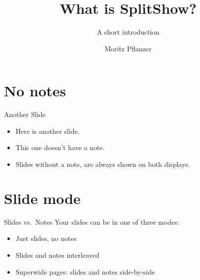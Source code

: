 \documentclass[14pt]{beamer}
\title{What is SplitShow?}
\subtitle{A short introduction}
\author{Moritz Pflanzer}
\begin{document}
\begin{frame}[plain]
    \titlepage


\end{frame}

\section{No notes}

\begin{frame}{Another Slide}
    \begin{itemize}
        \item Here is another slide.
        \item This one doesn't have a note.
        \item Slides without a note, are always shown on both displays.
    \end{itemize}
\end{frame}

\section{Slide mode}

\begin{frame}{Slides vs.\ Notes}
    Your slides can be in one of three modes:
    \begin{itemize}
        \item Just slides, no notes
        \item Slides and notes interleaved
        \item Superwide pages: slides and notes side-by-side
    \end{itemize}
\end{frame}
\end{document}
